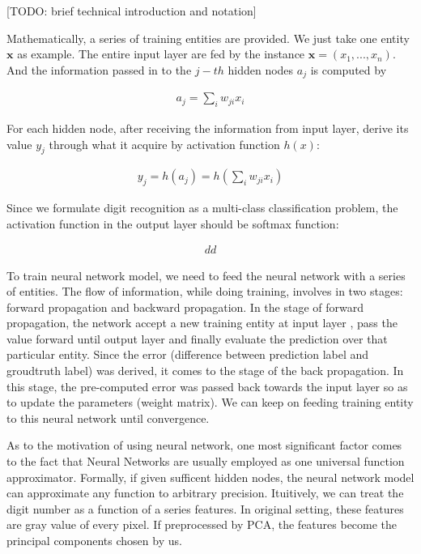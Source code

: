 \documentclass{article} %
\begin{document}
{\large [TODO: brief technical introduction and notation]}

Mathematically, a series of training entities are provided. We just take one
entity $\mathbf{x}$ as example. The entire input layer are fed by the instance
$\mathbf{x} = (x_1, ..., x_n)$. And the information passed in to the $j-th$
hidden nodes $a_j$ is computed by 

\begin{align}
    a_j = \sum_{i} w_{ji} x_i 
\end{align}

For each hidden node, after receiving the information from input layer,
derive its value $y_j$ through what it acquire by activation function $h(x)$:

\begin{align}
   y_j = h(a_j) = h(\sum_{i} w_{ji} x_i)    
\end{align}

Since we formulate digit recognition as a multi-class classification problem,
the activation function in the output layer should be softmax function: 

\begin{align}
    dd
\end{align}


To train neural network model, we need to feed the neural network with a
series of entities. The flow of information, while doing training,
involves in two stages: forward propagation and backward propagation.  In the
stage of forward propagation, the network accept a new training entity at input layer
, pass the value forward until output layer and finally evaluate the
prediction over that particular entity. Since the error (difference
between prediction label and groudtruth label) was derived, it comes to the
stage of the back propagation. In this stage, the pre-computed error was
passed back towards the input layer so as to update the parameters (weight
matrix). We can keep on feeding training entity to this neural network until
convergence.

As to the motivation of using neural network, one most significant factor
comes to the fact that Neural Networks are usually employed as one universal
function approximator. Formally, if given sufficent hidden nodes, the neural
network model can approximate any function to arbitrary precision. Ituitively,
we can treat the digit number as a function of a series features. In original
setting, these features are gray value of every pixel. If preprocessed by PCA,
the features become the principal components chosen by us. 
\end{document}
